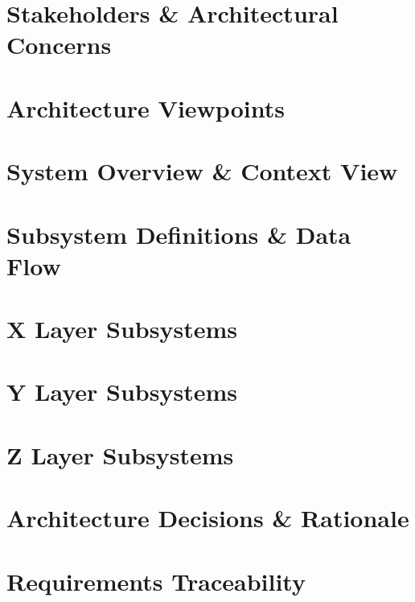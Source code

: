 \documentclass[11pt,letterpaper]{article}
\begin{document}
\section{Stakeholders \& Architectural Concerns}

\newpage
\section{Architecture Viewpoints}

\newpage
\section{System Overview \& Context View}

\newpage
\section{Subsystem Definitions \& Data Flow}

\newpage
\section{X Layer Subsystems}

\newpage
\section{Y Layer Subsystems}

\newpage
\section{Z Layer Subsystems}

\newpage
\section{Architecture Decisions \& Rationale}

\newpage
\section{Requirements Traceability}

\newpage


{}
\end{document}
